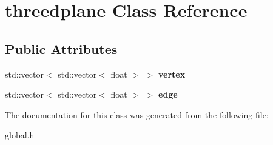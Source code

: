 \hypertarget{classthreedplane}{}\section{threedplane Class Reference}
\label{classthreedplane}
\subsection*{Public Attributes}
\begin{DoxyCompactItemize}
\item 
\mbox{\label{classthreedplane_a23d74654f188e7bcc1fdab00f836e293}} 
std\+::vector$<$ std\+::vector$<$ float $>$ $>$ {\bfseries vertex}
\item 
\mbox{\label{classthreedplane_a7a0ad6a72fb60c96740427b460e6983b}} 
std\+::vector$<$ std\+::vector$<$ float $>$ $>$ {\bfseries edge}
\end{DoxyCompactItemize}


The documentation for this class was generated from the following file\+:\begin{DoxyCompactItemize}
\item 
global.\+h\end{DoxyCompactItemize}
